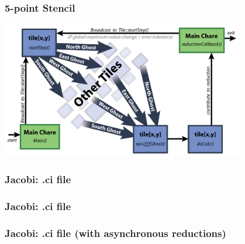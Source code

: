 \begin{frame}[fragile]
  \frametitle{5-point Stencil}
   \begin{center} \includegraphics[width=0.8\textwidth]{figures/2DJacobi_LogicFlow.jpg} \end{center}
\end{frame}

\begin{frame}[fragile]
  \frametitle{Jacobi: .ci file}
  
\end{frame}

\begin{frame}[fragile]
  \frametitle{Jacobi: .ci file}
  
\end{frame}

\begin{frame}[fragile]
  \frametitle{Jacobi: .ci file (with \textbf{asynchronous} reductions)}
  
\end{frame}

%   

%   

%   

%   

%   
